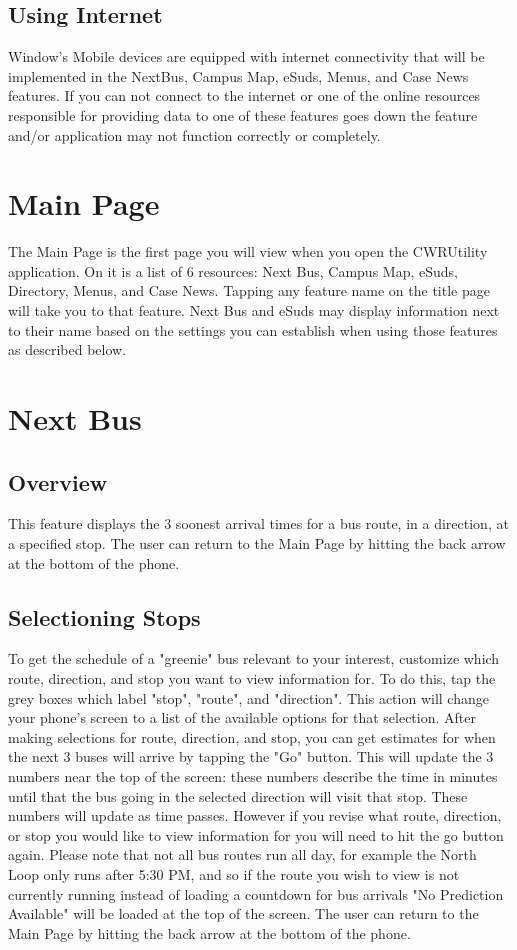 \documentclass[pdftex,12pt,letter]{article}
\begin{document}
\subsection{Using Internet}
Window's Mobile devices are equipped with  internet connectivity that will be implemented in the NextBus, Campus Map, eSuds, Menus, and Case News features. If you can not connect to the internet or one of the online resources responsible for providing data to one of these features goes down the feature and/or application may not function correctly or completely. 

\section{Main Page}
The Main Page is the first page you will view when you open the CWRUtility application. On it is a list of 6 resources: Next Bus, Campus Map, eSuds, Directory, Menus, and Case News. Tapping any feature name on the title page will take you to that feature. Next Bus and eSuds may display information next to their name based on the settings you can establish when using those features as described below. 

\section{Next Bus}
\subsection{Overview}
This feature displays the 3 soonest arrival times for a bus route, in a direction, at a specified stop. The user can return to the Main Page by hitting the back arrow at the bottom of the phone.
\subsection{Selectioning Stops}
To get the schedule of a "greenie" bus relevant to your interest, customize which route, direction, and stop you want to view information for. To do this, tap the grey boxes which label "stop", "route", and "direction". This action will change your phone's screen to a list of the available options for that selection. After making selections for route, direction, and stop, you can get estimates for when the next 3 buses will arrive by tapping the "Go" button. This will update the 3 numbers near the top of the screen: these numbers describe the time in minutes until that the bus going in the selected direction will visit that stop. These numbers will update as time passes. However if you revise what route, direction, or stop you would like to view information for you will need to hit the go button again. Please note that not all bus routes run all day, for example the North Loop only runs after 5:30 PM, and so if the route you wish to view is not currently running instead of loading a countdown for bus arrivals "No Prediction Available" will be loaded at the top of the screen. The user can return to the Main Page by hitting the back arrow at the bottom of the phone.
\end{document}
